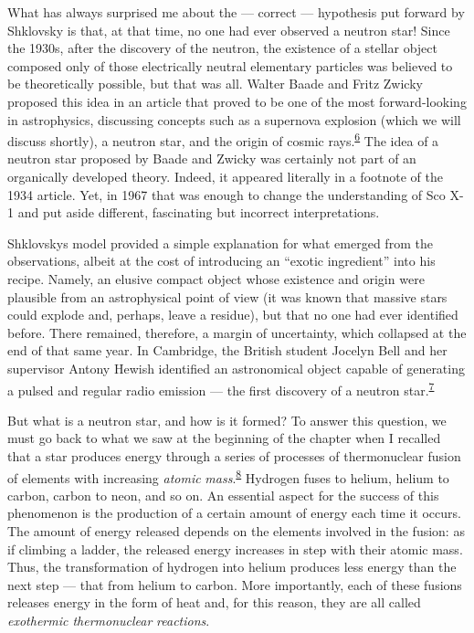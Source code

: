 What has always surprised me about the --- correct --- hypothesis put forward by
Shklovsky is that, at that time, no one had ever observed a neutron star! Since the
1930s, after the discovery of the neutron, the existence of a stellar object composed
only of those electrically neutral elementary particles was believed to be theoretically
possible, but that was all. Walter Baade and Fritz
Zwicky proposed this idea in an article that proved to be one of the
most forward-looking in astrophysics, discussing concepts such as a
supernova explosion (which we will discuss shortly), a neutron star,
and the origin of cosmic rays.\textsuperscript{\hyperlink{note:05-06}{6}} The idea of a neutron star proposed by
Baade and Zwicky was certainly not part of an organically developed theory. Indeed, it
appeared literally in a footnote of the 1934 article. Yet, in 1967 that was enough to
change the understanding of Sco X-1 and put aside different,
fascinating but incorrect interpretations.

Shklovsky\textquotesingle s model provided a simple explanation for what emerged from
the observations, albeit at the cost of introducing an ``exotic ingredient'' into his
recipe. Namely, an elusive compact object whose existence and origin were plausible from
an astrophysical point of view (it was known that massive stars could explode and,
perhaps, leave a residue), but that no one had ever identified before. There remained,
therefore, a margin of uncertainty, which collapsed at the end of that same year. In
Cambridge, the British student Jocelyn Bell and her supervisor Antony
Hewish identified an astronomical object capable of generating a
pulsed and regular radio emission --- the first discovery of a neutron
star.\textsuperscript{\hyperlink{note:05-07}{7}}

But what is a neutron star, and how is it formed? To answer this question, we must go
back to what we saw at the beginning of the chapter when I recalled that a star produces
energy through a series of processes of thermonuclear fusion of
elements with increasing \emph{atomic}
\emph{mass}.\textsuperscript{\hyperlink{note:05-08}{8}} Hydrogen fuses to helium, helium to carbon, carbon to
neon, and so on. An essential aspect for the success of this phenomenon is the
production of a certain amount of energy each time it occurs. The amount of energy
released depends on the elements involved in the fusion: as if climbing a ladder, the
released energy increases in step with their atomic mass. Thus, the transformation of
hydrogen into helium produces less energy than the next step --- that from helium to
carbon. More importantly, each of these fusions releases energy in the form of heat and,
for this reason, they are all called \emph{exothermic thermonuclear}
\emph{reactions}.

